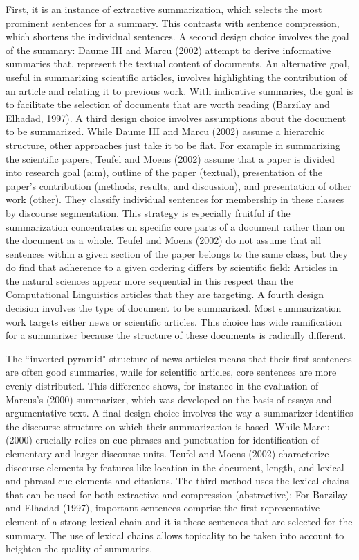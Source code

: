 First, it is an instance of extractive summarization, which selects the most prominent sentences for a summary.
This contrasts with sentence compression, which shortens the individual sentences. 
A second design choice involves the goal of the summary: Daume III and Marcu (2002) attempt to derive informative summaries that. represent the textual content of documents. 
An alternative goal, useful in summarizing scientific articles, involves highlighting the contribution of an article and relating it to previous work. 
With indicative summaries, the goal is to facilitate the selection of documents that are worth reading (Barzilay and Elhadad, 1997). 
A third design choice involves assumptions about the document to be summarized.
While  Daume III and Marcu (2002) assume a hierarchic structure, other approaches just take it to be flat. 
For example in summarizing the scientific papers, Teufel and Moens (2002) assume that a paper is divided into research goal (aim), outline of the paper (textual), presentation of the paper's contribution (methods, results, and discussion), and presentation of other work (other). 
They classify individual sentences for membership in these classes by discourse segmentation. 
This strategy is especially fruitful if the summarization concentrates on specific core parts of a document rather than on the document as a whole. 
Teufel and Moens (2002) do not assume that all sentences within a given section of the paper belongs to the same class, but they do find that adherence to a given ordering differs by scientific field: Articles in the natural sciences appear more sequential in this respect than the Computational Linguistics articles that they are targeting. 
A fourth design decision involves the type of document to be summarized.
Most summarization work targets either news or scientific articles. 
This choice has wide ramification for a summarizer because the structure of these documents is radically different. 
 
The ``inverted pyramid" structure of news articles means that their first sentences are often good summaries, while for scientific articles, core sentences are more evenly distributed. 
This difference shows, for instance in the evaluation of Marcus's (2000) summarizer, which was developed on the basis of essays and argumentative text.
A final design choice involves the way a summarizer identifies the discourse structure on which their summarization is based. 
While Marcu (2000) crucially relies on cue phrases and punctuation for identification of elementary and larger discourse units. 
Teufel and Moens (2002) characterize discourse elements by features like location in the document, length, and lexical and phrasal cue elements and citations. 
The third method uses the lexical chains that can be used for both extractive and compression (abstractive): For Barzilay and Elhadad (1997), important sentences comprise the first representative element of a strong lexical chain and it is these sentences that are selected for the summary. 
The use of lexical chains allows topicality to be taken into account to heighten the quality of summaries. 


